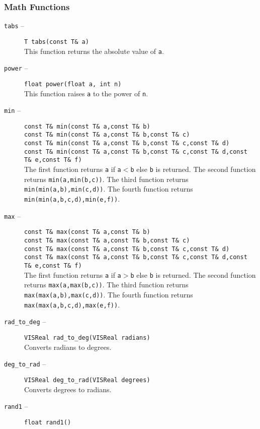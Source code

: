 \subsubsection{Math Functions}
\label{ul_mf}
\begin{description}
\item[{\tt tabs} --]
{\tt T tabs(const T\& a)}\\
This function returns the absolute value of {\tt a}.
\item[{\tt power} --]
{\tt float power(float a, int n)}\\
This function raises {\tt a} to the power of {\tt n}.
\item[{\tt min} --]
{\tt const T\& min(const T\& a,const T\& b)}\\
{\tt const T\& min(const T\& a,const T\& b,const T\& c)}\\
{\tt const T\& min(const T\& a,const T\& b,const T\& c,const T\& d)}\\
{\tt const T\& min(const T\& a,const T\& b,const T\& c,const T\& d,const T\& e,const T\& f)}\\
The first function returns {\tt a} if {\tt a}$<${\tt b} 
else {\tt b} is returned.
The second function returns {\tt min(a,min(b,c))}.
The third function returns {\tt min(min(a,b),min(c,d))}.
The fourth function returns {\tt min(min(a,b,c,d),min(e,f))}.
\item[{\tt max} --]
{\tt const T\& max(const T\& a,const T\& b)}\\
{\tt const T\& max(const T\& a,const T\& b,const T\& c)}\\
{\tt const T\& max(const T\& a,const T\& b,const T\& c,const T\& d)}\\
{\tt const T\& max(const T\& a,const T\& b,const T\& c,const T\& d,const T\& e,const T\& f)}\\
The first function returns {\tt a} if {\tt a}$>${\tt b} else {\tt b} is
returned.
The second function returns {\tt max(a,max(b,c))}.
The third function returns {\tt max(max(a,b),max(c,d))}.
The fourth function returns {\tt max(max(a,b,c,d),max(e,f))}.
\item[{\tt rad\_to\_deg} --]
{\tt VISReal rad\_to\_deg(VISReal radians)}\\
Converts radians to degrees.
\item[{\tt deg\_to\_rad} --]
{\tt VISReal deg\_to\_rad(VISReal degrees)}\\
Converts degrees to radians.
\item[{\tt rand1} --]
{\tt float rand1()}\\

\end{description}
